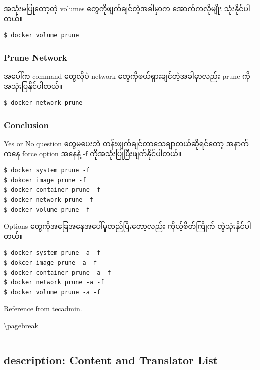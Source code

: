 အသုံးမပြုတော့တဲ့ volumes တွေကိုဖျက်ချင်တဲ့အခါမှာက အောက်ကလိုမျိုး
သုံးနိုင်ပါတယ်။

\begin{verbatim}
$ docker volume prune
\end{verbatim}

\subsubsection{Prune Network}\label{prune-network}

အပေါ်က command တွေလိုပဲ network တွေကိုဖယ်ရှားချင်တဲ့အခါမှာလည်း prune
ကိုအသုံးပြနိုင်ပါတယ်။

\begin{verbatim}
$ docker network prune
\end{verbatim}

\subsubsection{Conclusion}\label{conclusion}

Yes or No question တွေမပေးဘဲ တန်းဖျက်ချင်တာသေချာတယ်ဆိုရင်တော့ အနာက်ကနေ
force option အနေနဲ့ -f ကိုအသုံးပြုပြီးဖျက်နိုင်ပါတယ်။

\begin{verbatim}
$ docker system prune -f
$ dokcer image prune -f
$ docker container prune -f
$ docker network prune -f
$ docker volume prune -f
\end{verbatim}

Options တွေကိုအခြေအနေအပေါ်မူတည်ပြီးတော့လည်း ကိုယ့်စိတ်ကြိုက်
တွဲသုံးနိုင်ပါတယ်။

\begin{verbatim}
$ docker system prune -a -f
$ dokcer image prune -a -f
$ docker container prune -a -f
$ docker network prune -a -f
$ docker volume prune -a -f
\end{verbatim}

Reference from
\href{https://tecadmin.net/tutorial/docker/docker-prune-unused-objects/}{tecadmin}.

\textbackslash{}pagebreak

\begin{center}\rule{3in}{0.4pt}\end{center}

\subsection{description: Content and Translator
List}\label{description-content-and-translator-list}

